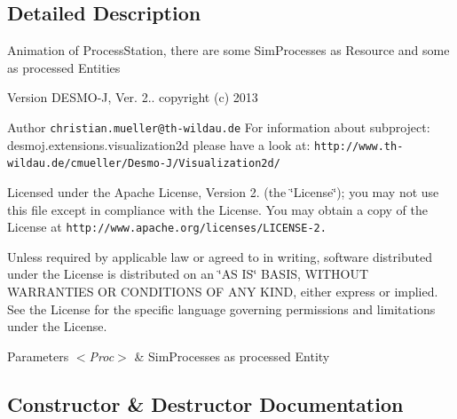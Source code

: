 \subsection{Detailed Description}
Animation of Process\-Station, there are some Sim\-Processes as Resource and some as processed Entities

\begin{DoxyVersion}{Version}
D\-E\-S\-M\-O-\/\-J, Ver. 2.. copyright (c) 2013 
\end{DoxyVersion}
\begin{DoxyAuthor}{Author}
{\tt christian.\-mueller@th-\/wildau.\-de} For information about subproject\-: desmoj.\-extensions.\-visualization2d please have a look at\-: {\tt http\-://www.\-th-\/wildau.\-de/cmueller/\-Desmo-\/\-J/\-Visualization2d/}
\end{DoxyAuthor}
Licensed under the Apache License, Version 2. (the \char`\"{}\-License\char`\"{}); you may not use this file except in compliance with the License. You may obtain a copy of the License at {\tt http\-://www.\-apache.\-org/licenses/\-L\-I\-C\-E\-N\-S\-E-\/2.}

Unless required by applicable law or agreed to in writing, software distributed under the License is distributed on an \char`\"{}\-A\-S I\-S\char`\"{} B\-A\-S\-I\-S, W\-I\-T\-H\-O\-U\-T W\-A\-R\-R\-A\-N\-T\-I\-E\-S O\-R C\-O\-N\-D\-I\-T\-I\-O\-N\-S O\-F A\-N\-Y K\-I\-N\-D, either express or implied. See the License for the specific language governing permissions and limitations under the License.


\begin{DoxyParams}{Parameters}
{\em $<$\-Proc$>$} & Sim\-Processes as processed Entity \\
\hline
\end{DoxyParams}


\subsection{Constructor \& Destructor Documentation}
